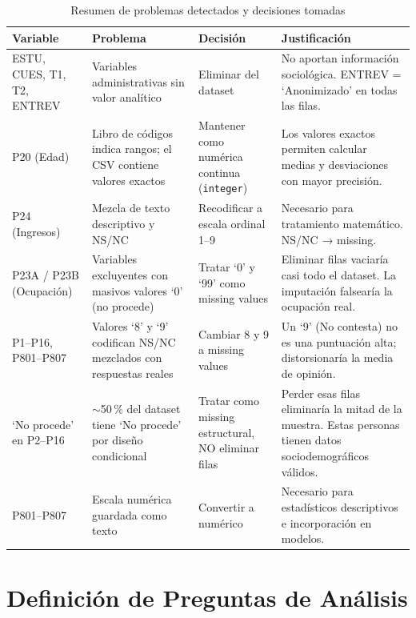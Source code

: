 \documentclass[12pt,a4paper]{article}
\newcommand{\thead}[1]{\cellcolor{tableheader}\color{white}\textbf{#1}}
\begin{document}
\begin{table}[H]
\centering
\renewcommand{\arraystretch}{1.5}
\begin{tabularx}{\linewidth}{p{2.8cm} p{3cm} p{2.8cm} X}
\toprule
\thead{Variable} & \thead{Problema} & \thead{Decisión} & \thead{Justificación} \\
\midrule
ESTU, CUES, T1, T2, ENTREV
  & Variables administrativas sin valor analítico
  & Eliminar del dataset
  & No aportan información sociológica. ENTREV = `Anonimizado' en todas las filas. \\
\rowcolor{tablerow}
P20 (Edad)
  & Libro de códigos indica rangos; el CSV contiene valores exactos
  & Mantener como numérica continua (\texttt{integer})
  & Los valores exactos permiten calcular medias y desviaciones con mayor precisión. \\
P24 (Ingresos)
  & Mezcla de texto descriptivo y NS/NC
  & Recodificar a escala ordinal 1--9
  & Necesario para tratamiento matemático. NS/NC → missing. \\
\rowcolor{tablerow}
P23A / P23B (Ocupación)
  & Variables excluyentes con masivos valores `0' (no procede)
  & Tratar `0' y `99' como missing values
  & Eliminar filas vaciaría casi todo el dataset. La imputación falsearía la ocupación real. \\
P1--P16, P801--P807
  & Valores `8' y `9' codifican NS/NC mezclados con respuestas reales
  & Cambiar 8 y 9 a missing values
  & Un `9' (No contesta) no es una puntuación alta; distorsionaría la media de opinión. \\
\rowcolor{tablerow}
`No procede' en P2--P16
  & $\sim$50\,\% del dataset tiene `No procede' por diseño condicional
  & Tratar como missing estructural, NO eliminar filas
  & Perder esas filas eliminaría la mitad de la muestra. Estas personas tienen datos sociodemográficos válidos. \\
P801--P807
  & Escala numérica guardada como texto
  & Convertir a numérico
  & Necesario para estadísticos descriptivos e incorporación en modelos. \\
\bottomrule
\end{tabularx}
\caption{Resumen de problemas detectados y decisiones tomadas}
\end{table}

\newpage

\section{Definición de Preguntas de Análisis}
\end{document}
